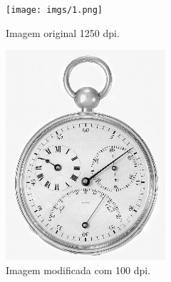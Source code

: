 \documentclass{article}
\begin{document}
\begin{figure}[H]
    \centering
    \caption{Imagens do relógio.}
    \begin{subfigure}[b]{0.3\textwidth}
        \texttt{[image: imgs/1.png]}
        \caption{Imagem original 1250 dpi.}
        \label{fig:clock_original}
    \end{subfigure}%
    \hfill
    \begin{subfigure}[b]{0.3\textwidth}
        \includegraphics[width=\textwidth]{imgs/2.png}
        \caption{Imagem modificada com 100 dpi.}
        \label{fig:clock_300dpi}
    \end{subfigure}%
    \hfill
    \begin{subfigure}[b]{0.3\textwidth}

\end{subfigure}
\end{figure}
\end{document}
